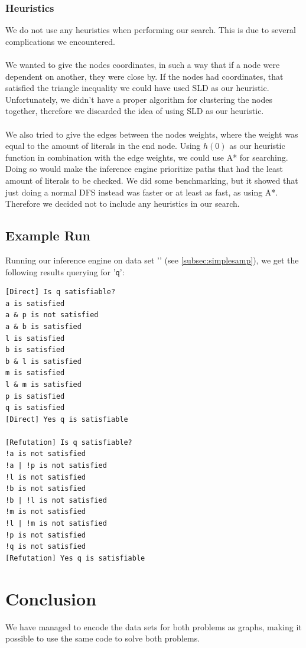 \documentclass[11pt]{article}
\begin{document}
\subsubsection{Heuristics}
We do not use any heuristics when performing our search. This is due to several complications we encountered.\\
\\
We wanted to give the nodes coordinates, in such a way that if a node were dependent on another, they were close by. If the nodes had coordinates, that satisfied the triangle inequality we could have used SLD as our heuristic. Unfortunately, we didn't have a proper algorithm for clustering the nodes together, therefore we discarded the idea of using SLD as our heuristic.\\
\\
We also tried to give the edges between the nodes weights, where the weight was equal to the amount of literals in the end node. Using $h(0)$ as our heuristic function in combination with the edge weights, we could use A* for searching. Doing so would make the inference engine prioritize paths that had the least amount of literals to be checked. We did some benchmarking, but it showed that just doing a normal DFS instead was faster or at least as fast, as using A*. Therefore we decided not to include any heuristics in our search.

\subsection{Example Run}
Running our inference engine on data set '' (see \ref{subsec:simplesamp}), we get the following results querying for '{\tt q}':
\begin{lstlisting}[style=logoutput]
[Direct] Is q satisfiable?
a is satisfied
a & p is not satisfied
a & b is satisfied
l is satisfied
b is satisfied
b & l is satisfied
m is satisfied
l & m is satisfied
p is satisfied
q is satisfied
[Direct] Yes q is satisfiable

[Refutation] Is q satisfiable?
!a is not satisfied
!a | !p is not satisfied
!l is not satisfied
!b is not satisfied
!b | !l is not satisfied
!m is not satisfied
!l | !m is not satisfied
!p is not satisfied
!q is not satisfied
[Refutation] Yes q is satisfiable
\end{lstlisting}

\section{Conclusion}
We have managed to encode the data sets for both problems as graphs, making it possible to use the same code to solve both problems.
\end{document}
